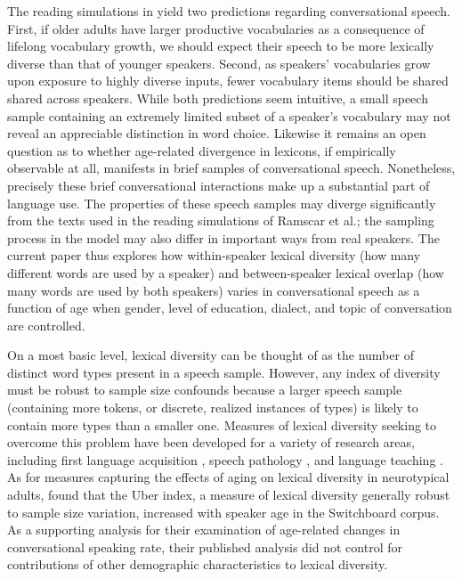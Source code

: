 \documentclass[10pt,letterpaper]{article}
\begin{document}
The reading simulations in \citet{ramscarEtAl2014} yield two predictions regarding conversational speech. First, if older adults have larger productive vocabularies as a consequence of lifelong vocabulary growth, we should expect their speech to be more lexically diverse than that of younger speakers. Second, as speakers' vocabularies grow upon exposure to highly diverse inputs, fewer vocabulary items should be shared shared across speakers.
While both predictions seem intuitive, a small speech sample containing an extremely limited subset of a speaker's vocabulary may not reveal an appreciable distinction in word choice. Likewise it remains an open question as to whether age-related divergence in lexicons, if empirically observable at all, manifests in brief samples of conversational speech. 
Nonetheless, precisely these brief conversational interactions make up a substantial part of language use.
The properties of these speech samples may diverge significantly from the texts used in the reading simulations of Ramscar et al.; the sampling process in the model may also differ in important ways from real speakers.
The current paper thus explores how within-speaker lexical diversity (how many different words are used by a speaker) and between-speaker lexical overlap (how many words are used by both speakers) varies in conversational speech as a function of age when gender, level of education, dialect, and topic of conversation are controlled.

On a most basic level, lexical diversity can be thought of as the number of distinct word types present in a speech sample. However, any index of diversity must be robust to sample size confounds because a larger speech sample (containing more tokens, or discrete, realized instances of types) is likely to contain more types than a smaller one. 
Measures of lexical diversity seeking to overcome this problem have been developed for a variety of research areas, including first language acquisition \citep{duranEtAl2004}, speech pathology \citep{watkinsEtAl1995}, and language teaching \citep{malvernRichards2002}. 
As for measures capturing the effects of aging on lexical diversity in neurotypical adults, \citet{hortonEtAl2010} found that the Uber index, a measure of lexical diversity generally robust to sample size variation, increased with speaker age in the Switchboard corpus. 
As a supporting analysis for their examination of age-related changes in conversational speaking rate, their published analysis did not control for contributions of other demographic characteristics to lexical diversity. 
\end{document}
